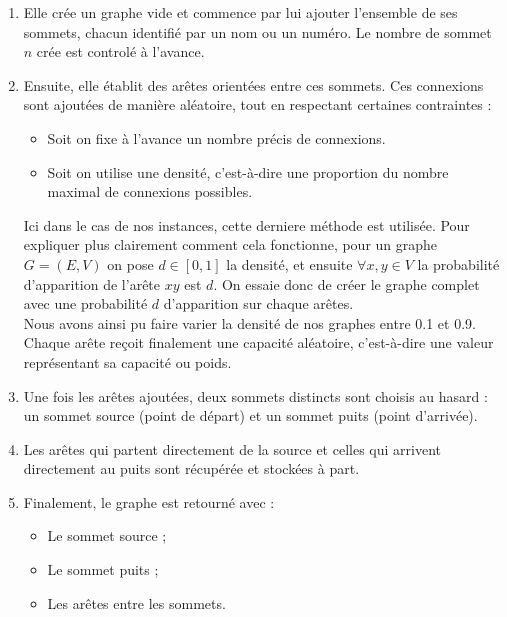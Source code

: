 \documentclass[a4paper]{article}
\begin{document}
\begin{enumerate}
    \item Elle crée un graphe vide et commence par lui ajouter l'ensemble de ses sommets, chacun identifié par un nom ou un numéro. Le nombre de sommet $n$ crée est controlé à l'avance.
    
    \item Ensuite, elle établit des arêtes orientées entre ces sommets. Ces connexions sont ajoutées de manière aléatoire, tout en respectant certaines contraintes :
    \begin{itemize}
        \item Soit on fixe à l’avance un nombre précis de connexions.
        \item Soit on utilise une densité, c’est-à-dire une proportion du nombre maximal de connexions possibles.
    \end{itemize}
	Ici dans le cas de nos instances, cette derniere méthode est utilisée. Pour expliquer plus clairement comment cela fonctionne, pour un graphe $G=(E,V)$ on pose $d \in [0,1]$ la densité, et ensuite $\forall x, y \in V$ la probabilité d'apparition de l'arête $xy$ est $d$. On essaie donc de créer le graphe complet avec une probabilité $d$ d'apparition sur chaque arêtes.\\
	Nous avons ainsi pu faire varier la densité de nos graphes entre 0.1 et 0.9.\\
    Chaque arête reçoit finalement une capacité aléatoire, c’est-à-dire une valeur représentant sa \og capacité\fg{} ou \og poids\fg{}.
    
    \item Une fois les arêtes ajoutées, deux sommets distincts sont choisis au hasard : un sommet source (point de départ) et un sommet puits (point d’arrivée).
    
    \item Les arêtes qui partent directement de la source et celles qui arrivent directement au puits sont récupérée et stockées à part.
    
    \item Finalement, le graphe est retourné avec :
    \begin{itemize}
        \item Le sommet source ;
        \item Le sommet puits ;
        \item Les arêtes entre les sommets.
    \end{itemize}
\end{enumerate}
\end{document}
